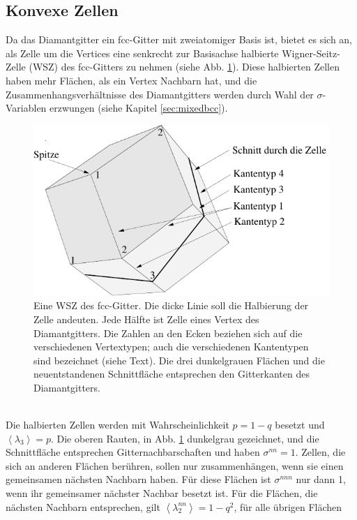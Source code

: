 \subsection{Konvexe Zellen}
\label{sec:appdiamantconvex}
Da das Diamantgitter ein fcc-Gitter mit zweiatomiger Basis ist, bietet es sich an, als Zelle um die Vertices eine senkrecht zur Basisachse halbierte Wigner-Seitz-Zelle (WSZ) des fcc-Gitters zu nehmen (siehe Abb. \ref{fig:fcc_half}). Diese halbierten Zellen haben mehr Fl\"achen, als ein Vertex Nachbarn hat, und die Zusammenhangsverh\"altnisse des Diamantgitters werden durch Wahl der $\sigma$-Variablen erzwungen (siehe Kapitel \ref{sec:mixedbcc}).   
\begin{figure}[htbp] 
  \centering
  \includegraphics{./Fluct_topo-Figs/fcc_half}
  \caption{Eine WSZ des fcc-Gitter. Die dicke Linie soll die Halbierung der Zelle andeuten. Jede H\"alfte ist Zelle eines Vertex des Diamantgitters. Die Zahlen an den Ecken beziehen sich auf die verschiedenen Vertextypen; auch die verschiedenen Kantentypen sind bezeichnet (siehe Text). Die drei dunkelgrauen Fl\"achen und die neuentstandenen Schnittfl\"ache entsprechen den Gitterkanten des Diamantgitters.}
  \label{fig:fcc_half}
\end{figure}
\\Die halbierten Zellen werden mit Wahrscheinlichkeit $p=1-q$ besetzt und $\left<\lambda_3\right>=p$. Die oberen Rauten, in Abb. \ref{fig:fcc_half} dunkelgrau gezeichnet, und die Schnittfl\"ache entsprechen Gitternachbarschaften und haben $\sigma^{nn}=1$. Zellen, die sich an anderen Fl\"achen ber\"uhren, sollen nur zusammenh\"angen, wenn sie einen gemeinsamen n\"achsten Nachbarn haben. F\"ur diese Fl\"achen ist $\sigma^{nnn}$ nur dann 1, wenn ihr gemeinsamer n\"achster Nachbar besetzt ist. F\"ur die Fl\"achen, die n\"achsten Nachbarn entsprechen, gilt $\left< \lambda_2^{nn}\right>=1-q^2$, f\"ur alle \"ubrigen Fl\"achen 
